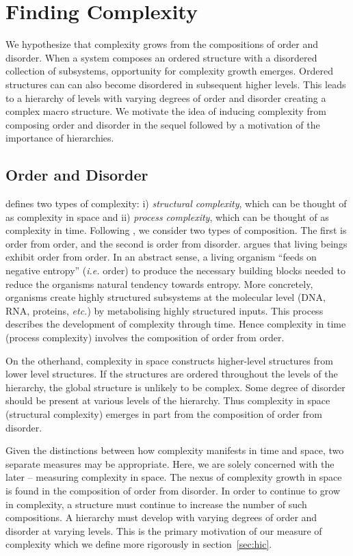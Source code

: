 \section{Finding Complexity}
\label{sec:finding_complexity}

We hypothesize that complexity grows from the compositions of order and
disorder. When a system composes an ordered structure with a disordered
collection of subsystems, opportunity for complexity growth emerges. Ordered
structures can can also become disordered in subsequent higher levels. This
leads to a hierarchy of levels with varying degrees of order and disorder
creating a complex macro structure. We motivate the idea of inducing complexity
from composing order and disorder in the sequel followed by a motivation of the
importance of hierarchies.

\subsection{Order and Disorder}

\citet{adami2002complexity} defines two types of complexity: i) \emph{structural
complexity}, which can be thought of as complexity in space and ii)
\emph{process complexity}, which can be thought of as complexity in time.
Following \citet{schrodinger1944}, we consider two types of composition. The
first is order from order, and the second is order from disorder.  \citet[chap.
6]{schrodinger1944} argues that living beings exhibit order from order. In an
abstract sense, a living organism ``feeds on negative entropy'' (\emph{i.e.}
order) to produce the necessary building blocks needed to reduce the organisms
natural tendency towards entropy. More concretely, organisms create highly
structured subsystems at the molecular level (DNA, RNA, proteins, \emph{etc.})
by metabolising highly structured inputs. This process describes the
development of complexity through time. Hence complexity in time (process
complexity) involves the composition of order from order.

On the otherhand, complexity in space constructs higher-level structures from
lower level structures. If the structures are ordered throughout the levels of
the hierarchy, the global structure is unlikely to be complex. Some degree of
disorder should be present at various levels of the hierarchy. Thus complexity
in space (structural complexity) emerges in part from the composition of order
from disorder.

Given the distinctions between how complexity manifests in time and space, two
separate measures may be appropriate. Here, we are solely concerned with the
later -- measuring complexity in space. The nexus of complexity growth in space
is found in the composition of order from disorder. In order to continue to
grow in complexity, a structure must continue to increase the number of such
compositions. A hierarchy must develop with varying degrees of order and
disorder at varying levels. This is the primary motivation of our measure of
complexity which we define more rigorously in section~\ref{sec:hic}.

